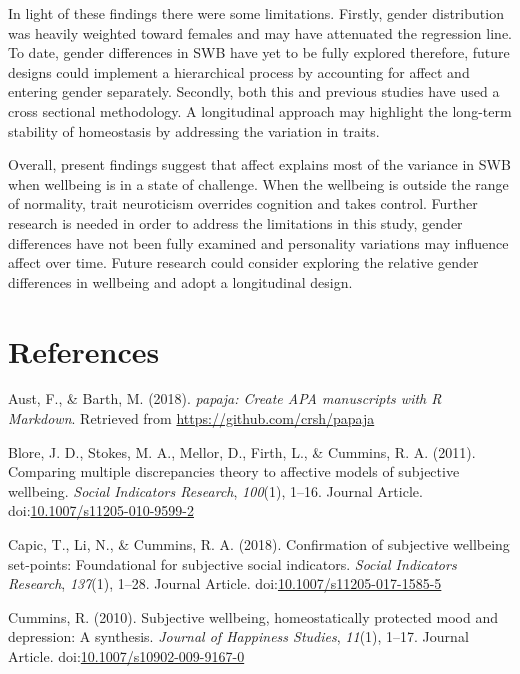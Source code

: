 \documentclass[man,floatsintext]{apa6}
\theoremstyle{definition}
\theoremstyle{definition}
\theoremstyle{definition}
\theoremstyle{remark}
\begin{document}
In light of these findings there were some limitations. Firstly, gender
distribution was heavily weighted toward females and may have attenuated
the regression line. To date, gender differences in SWB have yet to be
fully explored therefore, future designs could implement a hierarchical
process by accounting for affect and entering gender separately.
Secondly, both this and previous studies have used a cross sectional
methodology. A longitudinal approach may highlight the long-term
stability of homeostasis by addressing the variation in traits.

Overall, present findings suggest that affect explains most of the
variance in SWB when wellbeing is in a state of challenge. When the
wellbeing is outside the range of normality, trait neuroticism overrides
cognition and takes control. Further research is needed in order to
address the limitations in this study, gender differences have not been
fully examined and personality variations may influence affect over
time. Future research could consider exploring the relative gender
differences in wellbeing and adopt a longitudinal design.

\newpage

\section{References}\label{references}

\begingroup
\setlength{\parindent}{-0.5in} \setlength{\leftskip}{0.5in}

\hypertarget{refs}{}
\hypertarget{ref-R-papaja}{}
Aust, F., \& Barth, M. (2018). \emph{papaja: Create APA manuscripts with
R Markdown}. Retrieved from \url{https://github.com/crsh/papaja}

\hypertarget{ref-RN420}{}
Blore, J. D., Stokes, M. A., Mellor, D., Firth, L., \& Cummins, R. A.
(2011). Comparing multiple discrepancies theory to affective models of
subjective wellbeing. \emph{Social Indicators Research}, \emph{100}(1),
1--16. Journal Article.
doi:\href{https://doi.org/10.1007/s11205-010-9599-2}{10.1007/s11205-010-9599-2}

\hypertarget{ref-RN382}{}
Capic, T., Li, N., \& Cummins, R. A. (2018). Confirmation of subjective
wellbeing set-points: Foundational for subjective social indicators.
\emph{Social Indicators Research}, \emph{137}(1), 1--28. Journal
Article.
doi:\href{https://doi.org/10.1007/s11205-017-1585-5}{10.1007/s11205-017-1585-5}

\hypertarget{ref-RN421}{}
Cummins, R. (2010). Subjective wellbeing, homeostatically protected mood
and depression: A synthesis. \emph{Journal of Happiness Studies},
\emph{11}(1), 1--17. Journal Article.
doi:\href{https://doi.org/10.1007/s10902-009-9167-0}{10.1007/s10902-009-9167-0}
\end{document}
